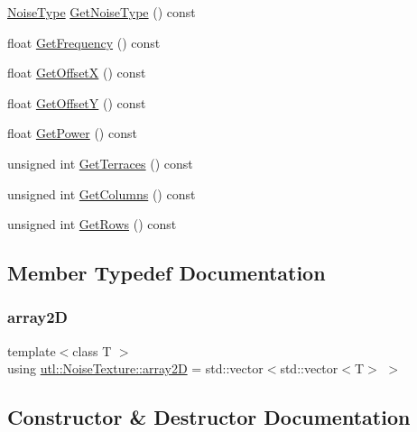 \begin{DoxyCompactItemize}
\item 
\mbox{\hyperlink{namespaceutl_a42b249122648f147a9f518c8661cc8d2}{Noise\+Type}} \mbox{\hyperlink{classutl_1_1_noise_texture_a30529be8130062cfe4867dea08aa6bc3}{Get\+Noise\+Type}} () const
\item 
float \mbox{\hyperlink{classutl_1_1_noise_texture_ad9d461fa123fb55d7999b9a0187664fd}{Get\+Frequency}} () const
\item 
float \mbox{\hyperlink{classutl_1_1_noise_texture_a45829f6b1b9efff9e55353e454d92fc7}{Get\+OffsetX}} () const
\item 
float \mbox{\hyperlink{classutl_1_1_noise_texture_aefd7f378393cdce66f3db6ef54ffd47c}{Get\+OffsetY}} () const
\item 
float \mbox{\hyperlink{classutl_1_1_noise_texture_acabbfbad778b09a0cd1989b290005510}{Get\+Power}} () const
\item 
unsigned int \mbox{\hyperlink{classutl_1_1_noise_texture_a41606f60346e598d1fb1d426f2a28a2d}{Get\+Terraces}} () const
\item 
unsigned int \mbox{\hyperlink{classutl_1_1_noise_texture_a899b227435709f48d167f0e4bcda7124}{Get\+Columns}} () const
\item 
unsigned int \mbox{\hyperlink{classutl_1_1_noise_texture_ac45cbc36392efc7ee910e4bc24fdcd3e}{Get\+Rows}} () const
\end{DoxyCompactItemize}


\subsection{Member Typedef Documentation}
\mbox{\label{classutl_1_1_noise_texture_a68a400f15c53ed50fe2c9bc8f6f1a9c9}} 
\subsubsection{\texorpdfstring{array2D}{array2D}}
{\footnotesize\ttfamily template$<$class T $>$ \\
using \mbox{\hyperlink{classutl_1_1_noise_texture_a68a400f15c53ed50fe2c9bc8f6f1a9c9}{utl\+::\+Noise\+Texture\+::array2D}} =  std\+::vector$<$std\+::vector$<$T$>$ $>$}



\subsection{Constructor \& Destructor Documentation}
\mbox{\label{classutl_1_1_noise_texture_ac60ee6e27d57bed1cdc20bacfb4364ee}} 
